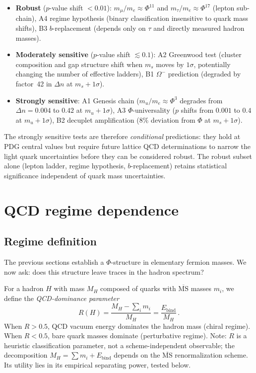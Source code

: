 \documentclass[11pt,a4paper]{article}
\begin{document}
\begin{itemize}
  \item \textbf{Robust} ($p$-value shift $< 0.01$):
        $m_\mu/m_e \approx \Phi^{11}$ and $m_\tau/m_e \approx \Phi^{17}$
        (lepton sub-chain), A4 regime hypothesis (binary classification
        insensitive to quark mass shifts), B3 $b$-replacement
        (depends only on $\tau$ and directly measured hadron masses).
  \item \textbf{Moderately sensitive} ($p$-value shift $\lesssim 0.1$):
        A2 Greenwood test (cluster composition and gap structure
        shift when $m_s$ moves by $1\sigma$, potentially changing
        the number of effective ladders), B1 $\Omega^-$ prediction
        (degraded by factor~42 in $\Delta n$ at $m_s + 1\sigma$).
  \item \textbf{Strongly sensitive}:
        A1 Genesis chain ($m_u/m_e \approx \Phi^3$ degrades from
        $\Delta n = 0.004$ to $0.42$ at $m_u + 1\sigma$),
        A3 $\Phi$-universality ($p$ shifts from $0.001$ to $0.4$ at
        $m_u + 1\sigma$), B2 decuplet amplification ($8\%$ deviation
        from $\Phi$ at $m_s + 1\sigma$).
\end{itemize}
The strongly sensitive tests are therefore \emph{conditional}
predictions: they hold at PDG central values but require future
lattice QCD determinations to narrow the light quark uncertainties
before they can be considered robust. The robust subset alone
(lepton ladder, regime hypothesis, $b$-replacement) retains
statistical significance independent of quark mass uncertainties.

\section{QCD regime dependence}
\label{sec:regime}

\subsection{Regime definition}
\label{sec:regimedef}

The previous sections establish a $\Phi$-structure in elementary
fermion masses. We now ask: does this structure leave traces in the
hadron spectrum?

For a hadron $H$ with mass $M_H$ composed of quarks with
$\overline{\text{MS}}$ masses $m_i$, we define the
\emph{QCD-dominance parameter}
\begin{equation}
  R(H) = \frac{M_H - \sum_i m_i}{M_H}
  = \frac{E_\text{bind}}{M_H}\,.
  \label{eq:regime}
\end{equation}
When $R > 0.5$, QCD vacuum energy dominates the hadron mass
(chiral regime). When $R < 0.5$, bare quark masses dominate
(perturbative regime).
Note: $R$ is a heuristic classification parameter, not a
scheme-independent observable; the decomposition
$M_H = \sum m_i + E_\text{bind}$ depends on the
$\overline{\text{MS}}$ renormalization scheme.
Its utility lies in its empirical separating power, tested below.
\end{document}
